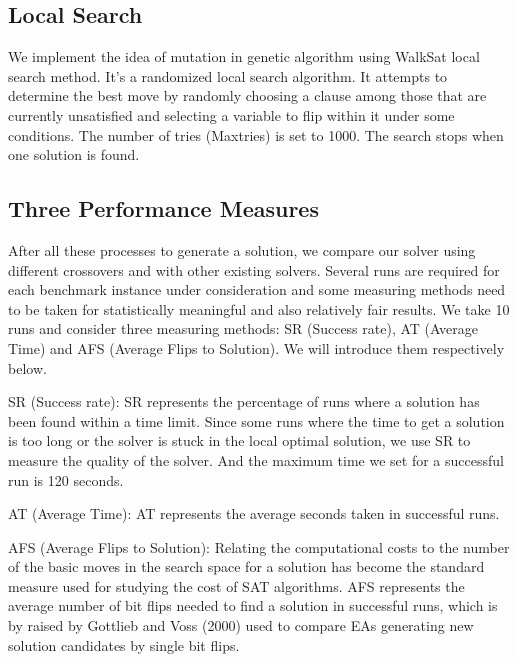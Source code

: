 \subsection{Local Search}
We implement the idea of mutation in genetic algorithm using WalkSat local search method. It's a randomized local search algorithm. It attempts to determine the best move by randomly choosing a clause among those that are currently unsatisfied and selecting a variable to flip within it under some conditions. The number of tries (Maxtries) is set to 1000. The search stops when one solution is found.

\subsection{Three Performance Measures}
After all these processes to generate a solution, we compare our solver using different crossovers and with other existing solvers. Several runs are required for each benchmark instance under consideration and some measuring methods need to be taken for statistically meaningful and also relatively fair results. We take 10 runs and consider three measuring methods: SR (Success rate), AT (Average Time) and AFS (Average Flips to Solution). We will introduce them respectively below.

SR (Success rate):
SR represents the percentage of runs where a solution has been found within a time limit. Since some runs where the time to get a solution is too long or the solver is stuck in the local optimal solution, we use SR to measure the quality of the solver. And the maximum time we set for a successful run is 120 seconds.

AT (Average Time):
AT represents the average seconds taken in successful runs.

AFS (Average Flips to Solution):
Relating the computational costs to the number of the basic moves in the search space for a solution has become the standard measure used for studying the cost of SAT algorithms\cite{hoos2005stochastic}. AFS represents the average number of bit flips needed to find a solution in successful runs, which is by raised by Gottlieb and Voss (2000) used to compare EAs generating new solution candidates by single bit flips. 